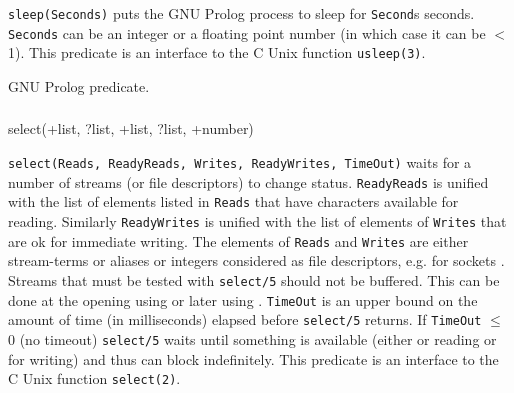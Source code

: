 \Description

\texttt{sleep(Seconds)} puts the GNU Prolog process to sleep for
\texttt{Second}s seconds. \texttt{Seconds} can be an integer or a floating
point number (in which case it can be $<$ 1). This predicate is an interface
to the C Unix function \texttt{usleep(3)}.

\begin{PlErrors}




\end{PlErrors}

\Portability

GNU Prolog predicate.

\subsubsection{\label{select/5}}

\begin{TemplatesOneCol}
select(+list, ?list, +list, ?list, +number)

\end{TemplatesOneCol}

\Description

\texttt{select(Reads, ReadyReads, Writes, ReadyWrites, TimeOut)} waits for a
number of streams (or file descriptors) to change status.
\texttt{ReadyReads} is unified with the list of elements listed in
\texttt{Reads} that have characters available for reading. Similarly
\texttt{ReadyWrites} is unified with the list of elements of \texttt{Writes}
that are ok for immediate writing. The elements of \texttt{Reads} and
\texttt{Writes} are either stream-terms or aliases or integers considered as
file descriptors, e.g. for sockets . Streams
that must be tested with \texttt{select/5} should not be buffered. This can
be done at the opening using   or later using
 .
\texttt{TimeOut} is an upper bound on the amount of time (in milliseconds)
elapsed before \texttt{select/5} returns. If \texttt{TimeOut} $\leq$ 0 (no
timeout) \texttt{select/5} waits until something is available (either or
reading or for writing) and thus can block indefinitely. This predicate is
an interface to the C Unix function \texttt{select(2)}.

